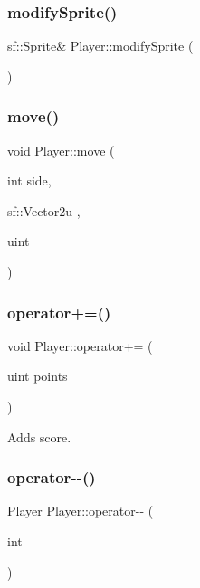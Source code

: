 \subsubsection{\texorpdfstring{modifySprite()}{modifySprite()}}
{\footnotesize\ttfamily sf\+::\+Sprite\& Player\+::modify\+Sprite (\begin{DoxyParamCaption}{ }\end{DoxyParamCaption})\hspace{0.3cm}{\ttfamily [inline]}}

\mbox{\label{class_player_aef0d42bebee03ea367cc38d07d614536}} 
\subsubsection{\texorpdfstring{move()}{move()}}
{\footnotesize\ttfamily void Player\+::move (\begin{DoxyParamCaption}\item[{int}]{side,  }\item[{sf\+::\+Vector2u}]{,  }\item[{uint}]{ }\end{DoxyParamCaption})}

\mbox{\label{class_player_a234802f1731a329b697fde399a20d0ad}} 
\subsubsection{\texorpdfstring{operator+=()}{operator+=()}}
{\footnotesize\ttfamily void Player\+::operator+= (\begin{DoxyParamCaption}\item[{uint}]{points }\end{DoxyParamCaption})\hspace{0.3cm}{\ttfamily [inline]}}



Adds score. 

\mbox{\label{class_player_ac56de355f4f7079ddc994ea16f05cda2}} 
\subsubsection{\texorpdfstring{operator-\/-\/()}{operator--()}}
{\footnotesize\ttfamily \mbox{\hyperlink{class_player}{Player}} Player\+::operator-\/-\/ (\begin{DoxyParamCaption}\item[{int}]{ }\end{DoxyParamCaption})}



